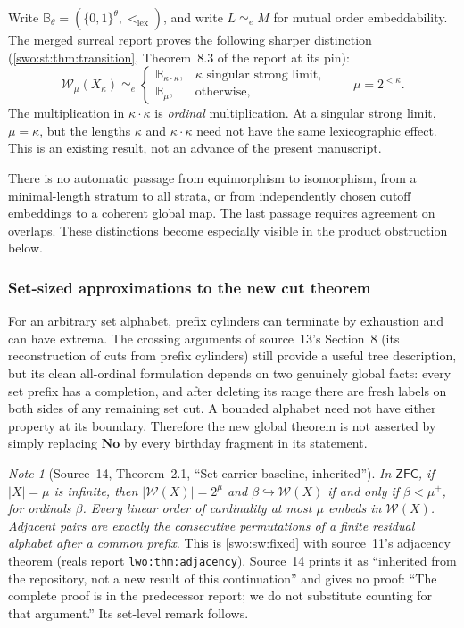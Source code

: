 \documentclass[11pt]{article}
\theoremstyle{definition}
\theoremstyle{remark}
\newtheorem{note}[note]{Note}
\newcommand{\No}{\mathbf{No}}
\newcommand{\WO}{\mathcal W}
\newcommand{\W}{\mathcal W}
\newcommand{\B}{\mathbb B}
\newcommand{\lex}{\mathrm{lex}}
\newcommand{\emb}{\hookrightarrow}
\newcommand{\equi}{\mathrel{\simeq_{\!e}}}
\newcommand{\ZFC}{\mathsf{ZFC}}
\newcommand{\card}[1]{\lvert #1\rvert}
\newcommand{\code}[1]{\texttt{\small #1}}
\begin{document}
Write $\B_\theta=(\{0,1\}^\theta,<_{\lex})$, and write $L\equi M$ for
mutual order embeddability. The merged surreal report proves the
following sharper distinction (\cref{swo:st:thm:transition}, Theorem~8.3 of
the report at its pin):
\[
 \W_\mu(X_\kappa)\equi
 \begin{cases}
  \B_{\kappa\cdot\kappa}, &\kappa\text{ singular strong limit},\\
  \B_\mu, &\text{otherwise},
 \end{cases}
 \qquad \mu=2^{<\kappa}.
\]
The multiplication in $\kappa\cdot\kappa$ is \emph{ordinal}
multiplication. At a singular strong limit, $\mu=\kappa$, but the
lengths $\kappa$ and $\kappa\cdot\kappa$ need not have the same
lexicographic effect. This is an existing result, not an advance of the
present manuscript.

There is no automatic passage from equimorphism to isomorphism, from a
minimal-length stratum to all strata, or from independently chosen
cutoff embeddings to a coherent global map. The last passage requires
agreement on overlaps. These distinctions become especially visible in
the product obstruction below.

\subsubsection{Set-sized approximations to the new cut theorem}

For an arbitrary set alphabet, prefix cylinders can terminate by
exhaustion and can have extrema. The crossing arguments of
source~13's Section~8 (its reconstruction of cuts from prefix cylinders) still provide a useful tree description, but
its clean all-ordinal formulation depends on two genuinely global facts:
every set prefix has a completion, and after deleting its range there
are fresh labels on both sides of any remaining set cut. A bounded
alphabet need not have either property at its boundary. Therefore the
new global theorem is not asserted by simply replacing $\No$ by every
birthday fragment in its statement.

\begin{note}[Source~14, Theorem~2.1, ``Set-carrier baseline, inherited'']\label{swo:tc:thm:setbaseline}
\emph{In $\ZFC$, if $\card X=\mu$ is infinite, then $\card{\WO(X)}=2^\mu$ and
$\beta\emb\WO(X)$ if and only if $\beta<\mu^+$, for ordinals $\beta$. Every
linear order of cardinality at most $\mu$ embeds in $\WO(X)$. Adjacent pairs
are exactly the consecutive permutations of a finite residual alphabet after a
common prefix.} This is \cref{swo:sw:fixed} with source~11's adjacency theorem
(reals report \code{lwo:thm:adjacency}). Source~14 prints it as ``inherited from
the repository, not a new result of this continuation'' and gives no proof:
``The complete proof is in the predecessor report; we do not substitute
counting for that argument.'' Its set-level remark follows.
\end{note}
\end{document}
